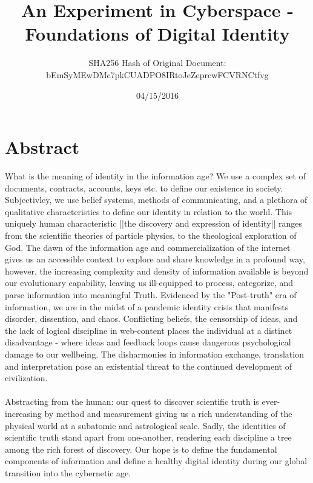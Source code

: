 \documentclass{article}
\title{An Experiment in Cyberspace - Foundations of Digital Identity}
\date{04/15/2016}
\author{SHA256 Hash of Original Document:\\ bEmSyMEwDMc7pkCUADPO8IRtoJeZeprcwFCVRNCtfvg }
\begin{document}
	\maketitle
	\newpage

	\tableofcontents
	\newpage
\section{Abstract}
	What is the meaning of identity in the information age?  We use a complex set of documents, contracts, accounts, keys etc. to define our existence in society.  Subjectivley, we use belief systems, methods of communicating, and a plethora of qualitative characteristics to define our identity in relation to the world.  This uniquely human characteristic ||the discovery and expression of identity|| ranges from the scientific theories of particle physics, to the theological exploration of God.  The dawn of the information age and commercialization of the internet gives us an accessible context to explore and share knowledge in a profound way, however, the increasing complexity and density of information available is beyond our evolutionary capability, leaving us ill-equipped to process, categorize, and parse information into meaningful Truth.  Evidenced by the "Post-truth" era of information, we are in the midst of a pandemic identity crisis that manifests disorder, dissention, and chaos.  Conflicting beliefs, the censorship of ideas, and the lack of logical discipline in web-content places the individual at a distinct disadvantage - where ideas and feedback loops cause dangerous psychological damage to our wellbeing.  The disharmonies in information exchange, translation and interpretation pose an existential threat to the continued development of civilization.   \\\\ 
Abstracting from the human: our quest to discover scientific truth is ever-increasing by method and measurement giving us a rich understanding of the physical world at a subatomic and astrological scale.  Sadly, the identities of scientific truth stand apart from one-another, rendering each discipline a tree among the rich forest of discovery.  Our hope is to define the fundamental components of information and define a healthy digital identity during our global transition into the cybernetic age. 
 
\end{document}
